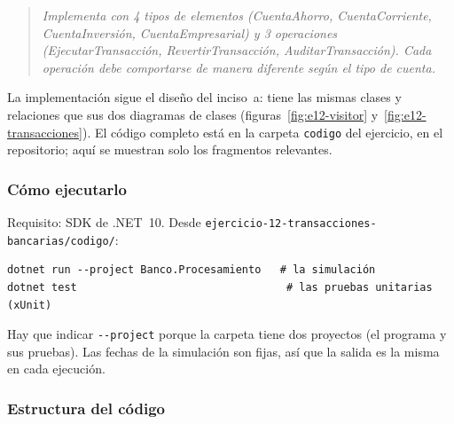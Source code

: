 
\begin{quote}
\itshape
Implementa con 4 tipos de elementos (CuentaAhorro, CuentaCorriente, CuentaInversión,
CuentaEmpresarial) y 3 operaciones (EjecutarTransacción, RevertirTransacción,
AuditarTransacción). Cada operación debe comportarse de manera diferente según el tipo de
cuenta.
\end{quote}

La implementación sigue el diseño del inciso~a: tiene las mismas clases y relaciones que sus
dos diagramas de clases (figuras~\ref{fig:e12-visitor} y~\ref{fig:e12-transacciones}). El
código completo está en la carpeta \texttt{codigo} del ejercicio, en el repositorio; aquí se
muestran solo los fragmentos relevantes.

\subsubsection{Cómo ejecutarlo}

Requisito: SDK de .NET~10. Desde \texttt{ejercicio-12-transacciones-bancarias/codigo/}:

\begin{lstlisting}[language={}, numbers=none, basicstyle=\ttfamily\footnotesize, columns=fullflexible, keepspaces=true]
dotnet run --project Banco.Procesamiento   # la simulación
dotnet test                                 # las pruebas unitarias (xUnit)
\end{lstlisting}

Hay que indicar \texttt{-{}-project} porque la carpeta tiene dos proyectos (el programa y
sus pruebas). Las fechas de la simulación son fijas, así que la salida es la misma en cada
ejecución.

\subsubsection{Estructura del código}

